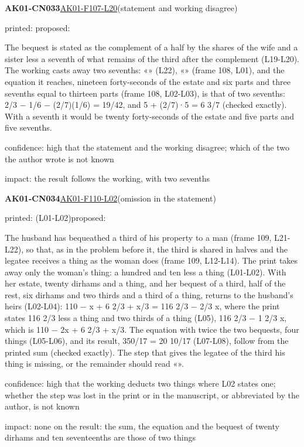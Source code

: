 \documentclass[11pt]{article}
\begin{document}
\noindent\textbf{AK01-CN033}\enspace\hyperlink{AK01-F107-L20}{AK01-F107-L20}\enspace(statement and working disagree)\par\noindent printed: \enspace proposed: \par\noindent The bequest is stated as the complement of a half by the shares of the wife and a sister less a seventh of what remains of the third after the complement (L19-L20). The working casts away two sevenths: «» (L22), «» (frame 108, L01), and the equation it reaches, nineteen forty-seconds of the estate and six parts and three sevenths equal to thirteen parts (frame 108, L02-L03), is that of two sevenths: 2/3 − 1/6 − (2/7)(1/6) = 19/42, and 5 + (2/7)·5 = 6 3/7 (checked exactly). With a seventh it would be twenty forty-seconds of the estate and five parts and five sevenths.\par\noindent confidence: high that the statement and the working disagree; which of the two the author wrote is not known\par\noindent impact: the result follows the working, with two sevenths\par\medskip
\noindent\textbf{AK01-CN034}\enspace\hyperlink{AK01-F110-L02}{AK01-F110-L02}\enspace(omission in the statement)\par\noindent printed:  (L01-L02)\enspace proposed: \par\noindent The husband has bequeathed a third of his property to a man (frame 109, L21-L22), so that, as in the problem before it, the third is shared in halves and the legatee receives a thing as the woman does (frame 109, L12-L14). The print takes away only the woman's thing: a hundred and ten less a thing (L01-L02). With her estate, twenty dirhams and a thing, and her bequest of a third, half of the rest, six dirhams and two thirds and a third of a thing, returns to the husband's heirs (L02-L04): 110 − x + 6 2/3 + x/3 = 116 2/3 − 2/3 x, where the print states 116 2/3 less a thing and two thirds of a thing (L05), 116 2/3 − 1 2/3 x, which is 110 − 2x + 6 2/3 + x/3. The equation with twice the two bequests, four things (L05-L06), and its result, 350/17 = 20 10/17 (L07-L08), follow from the printed sum (checked exactly). The step that gives the legatee of the third his thing is missing, or the remainder should read «».\par\noindent confidence: high that the working deducts two things where L02 states one; whether the step was lost in the print or in the manuscript, or abbreviated by the author, is not known\par\noindent impact: none on the result: the sum, the equation and the bequest of twenty dirhams and ten seventeenths are those of two things\par\medskip
\end{document}
